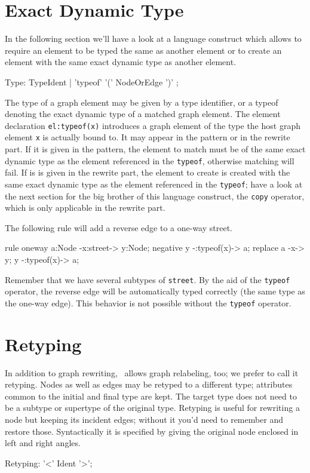 \section{Exact Dynamic Type}\label{sec:typeof}

In the following section we'll have a look at a language construct which allows to require an element to be typed the same as another element or to create an element with the same exact dynamic type as another element.

\begin{rail}
  Type: TypeIdent | 'typeof' '(' NodeOrEdge ')' ;
\end{rail}
The type of a graph element may be given by a type identifier,
or a typeof denoting the exact dynamic type of a matched graph element.
The element declaration \texttt{el:typeof(x)} introduces a graph element of the type the host graph element \texttt{x} is actually bound to.
It may appear in the pattern or in the rewrite part.
If it is given in the pattern, the element to match must be of the same exact dynamic type as the element referenced in the \texttt{typeof}, otherwise matching will fail.
If is is given in the rewrite part, the element to create is created with the same exact dynamic type as the element referenced in the \texttt{typeof}; have a look at the next section for the big brother of this language construct, the \texttt{copy} operator, which is only applicable in the rewrite part.

\begin{example}
The following rule will add a reverse edge to a one-way street.
\begin{grgen}
rule oneway {
    a:Node -x:street-> y:Node;
    negative {
        y -:typeof(x)-> a;
    }
    replace {
        a -x-> y;
        y -:typeof(x)-> a;
    }
}
\end{grgen}
Remember that we have several subtypes of \texttt{street}. By the aid of the \texttt{typeof} operator, the reverse edge will be automatically typed correctly (the same type as the one-way edge). This behavior is not possible without the \texttt{typeof} operator.
\end{example}


\section{Retyping} \label{sec:retype}
In addition to graph rewriting, \GrG\ allows graph relabeling\cite{Relabelling}, too; we prefer to call it retyping.
Nodes as well as edges may be retyped to a different type; attributes common to the initial and final type are kept.
The target type does not need to be a subtype or supertype of the original type.
Retyping is useful for rewriting a node but keeping its incident edges; without it you'd need to remember and restore those.
Syntactically it is specified by giving the original node enclosed in left and right angles.
\begin{rail}
  Retyping: '<' Ident '>';
\end{rail}

